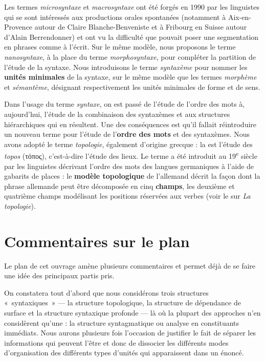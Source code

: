 {    Les termes \textit{microsyntaxe} et \textit{macrosyntaxe} ont été forgés en 1990 par les linguistes qui se sont intéressés aux productions orales spontanées (notamment à Aix-en-Provence autour de Claire Blanche-Benveniste et à Fribourg en Suisse autour d’Alain Berrendonner) et ont vu la difficulté que pouvait poser une segmentation en phrases comme à l’écrit. Sur le même modèle, nous proposons le terme \textit{nanosyntaxe}, à la place du terme \textit{morphosyntaxe}, pour compléter la partition de l’étude de la syntaxe. Nous introduisons le terme \textit{syntaxème} pour nommer les \textbf{unités minimales} de la syntaxe, sur le même modèle que les termes \textit{morphème} et \textit{sémantème}, désignant respectivement les unités minimales de forme et de sens.

    Dans l’usage du terme \textit{syntaxe}, on est passé de l’étude de l’ordre des mots à, aujourd’hui, l’étude de la combinaison des syntaxèmes et aux structures hiérarchiques qui en résultent. Une des conséquences est qu’il fallait réintroduire un nouveau terme pour l’étude de l’\textbf{ordre des mots} et des syntaxèmes. Nous avons adopté le terme \textit{topologie}, également d’origine grecque : la  est l’étude des \textit{topos} (τόπος), c’est-à-dire l’étude des lieux. Le terme a été introduit au 19\textsuperscript{e} siècle par les linguistes décrivant l’ordre des mots des langues germaniques à l’aide de gabarits de places : le \textbf{modèle topologique} de l’allemand décrit la façon dont la phrase allemande peut être décomposée en cinq \textbf{champs}, les deuxième et quatrième champs modélisant les positions réservées aux verbes (voir le  sur \textit{La topologie}).
}
\section{Commentaires sur le plan}\label{sec:0.0.10}

Le plan de cet ouvrage amène plusieurs commentaires et permet déjà de se faire une idée des principaux partis pris.

On constatera tout d’abord que nous considérons trois structures «~syntaxiques~» — la structure topologique, la structure de dépendance de surface et la structure syntaxique profonde — là où la plupart des approches n’en considèrent qu’une : la structure syntagmatique ou analyse en constituants immédiats. Nous aurons plusieurs fois l’occasion de justifier le fait de séparer les informations qui peuvent l’être et donc de dissocier les différents modes d’organisation des différents types d’unités qui apparaissent dans un énoncé.

